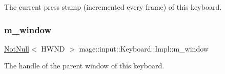 The current press stamp (incremented every frame) of this keyboard. \hypertarget{classmage_1_1input_1_1_keyboard_1_1_impl_a55d12479108b554c1139bad8318994db}{}\label{classmage_1_1input_1_1_keyboard_1_1_impl_a55d12479108b554c1139bad8318994db} 
\subsubsection{\texorpdfstring{m\+\_\+window}{m\_window}}
{\footnotesize\ttfamily \hyperlink{namespacemage_a8769f9d670d6b585ea306cb1062af94b}{Not\+Null}$<$ H\+W\+ND $>$ mage\+::input\+::\+Keyboard\+::\+Impl\+::m\+\_\+window\hspace{0.3cm}{\ttfamily [private]}}

The handle of the parent window of this keyboard. 